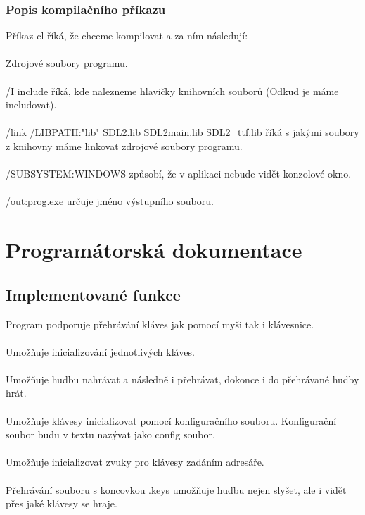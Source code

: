 \documentclass[12pt]{article}
\begin{document}
	\subsubsection{Popis kompilačního příkazu}
	Příkaz cl říká, že chceme kompilovat a za ním následují:
	\\
	\\
	Zdrojové soubory programu.
	\\
	\\
	/I include říká, kde nalezneme hlavičky knihovních souborů (Odkud je máme includovat).
	\\
	\\
	/link /LIBPATH:"lib" SDL2.lib SDL2main.lib SDL2\_ttf.lib říká s jakými soubory z knihovny máme linkovat zdrojové soubory programu.
	\\
	\\
	/SUBSYSTEM:WINDOWS způsobí, že v aplikaci nebude vidět konzolové okno.
	\\
	\\
	/out:prog.exe určuje jméno výstupního souboru.

	\newpage  
	\maketitle\section{Programátorská dokumentace}
	\subsection{Implementované funkce}
	Program podporuje přehrávání kláves jak pomocí myši tak i klávesnice. 
	\\
	\\
	Umožňuje inicializování jednotlivých kláves.
	\\
	\\
	Umožňuje hudbu nahrávat a následně i přehrávat, dokonce i do přehrávané hudby hrát. 
	\\
	\\
	Umožňuje klávesy inicializovat pomocí konfiguračního souboru. Konfigurační soubor budu v textu nazývat jako config soubor.
	\\
	\\
	Umožňuje inicializovat zvuky pro klávesy zadáním adresáře.
	\\
	\\
	Přehrávání souboru s koncovkou .keys umožňuje hudbu nejen slyšet, ale i vidět přes jaké klávesy se hraje.
	
\end{document}
